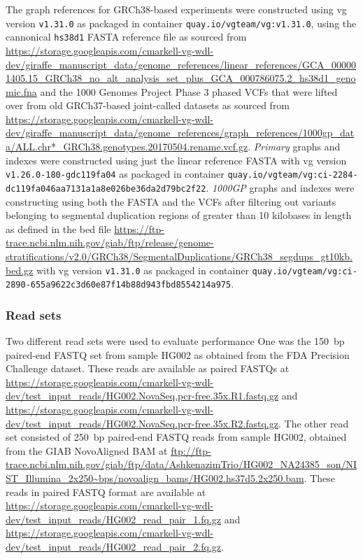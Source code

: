 \documentclass[11pt]{ucscthesis}
\newcommand{\vocab}[1]{\emph{#1}}
\begin{document}
The graph references for GRCh38-based experiments were constructed using vg version \texttt{v1.31.0} as packaged in container \texttt{quay.io/vgteam/vg:v1.31.0}, using the cannonical \texttt{hs38d1} FASTA reference file as sourced from \url{https://storage.googleapis.com/cmarkell-vg-wdl-dev/giraffe_manuscript_data/genome_references/linear_references/GCA_000001405.15_GRCh38_no_alt_analysis_set_plus_GCA_000786075.2_hs38d1_genomic.fna} and the 1000 Genomes Project Phase 3 phased VCFs that were lifted over from old GRCh37-based joint-called datasets as sourced from \url{https://storage.googleapis.com/cmarkell-vg-wdl-dev/giraffe_manuscript_data/genome_references/graph_references/1000gp_data/ALL.chr*_GRCh38.genotypes.20170504.rename.vcf.gz}.
\vocab{Primary} graphs and indexes were constructed using just the linear reference FASTA with vg version \texttt{v1.26.0-180-gdc119fa04} as packaged in container \texttt{quay.io/vgteam/vg:ci-2284-dc119fa046aa7131a1a8e026be36da2d79bc2f22}.
\vocab{1000GP} graphs and indexes were constructing using both the FASTA and the VCFs after filtering out variants belonging to segmental duplication regions of greater than 10 kilobases in length as defined in the bed file \url{https://ftp-trace.ncbi.nlm.nih.gov/giab/ftp/release/genome-stratifications/v2.0/GRCh38/SegmentalDuplications/GRCh38_segdups_gt10kb.bed.gz} with vg version \texttt{v1.31.0} as packaged in container \texttt{quay.io/vgteam/vg:ci-2890-655a9622c3d60e87f14b88d943fbd8554214a975}.


\subsubsection{Read sets}
Two different read sets were used to evaluate performance
One was the 150~bp paired-end FASTQ set from sample HG002 as obtained from the FDA Precision Challenge dataset.
These reads are available as paired FASTQs at \url{https://storage.googleapis.com/cmarkell-vg-wdl-dev/test_input_reads/HG002.NovaSeq.pcr-free.35x.R1.fastq.gz} and \url{https://storage.googleapis.com/cmarkell-vg-wdl-dev/test_input_reads/HG002.NovaSeq.pcr-free.35x.R2.fastq.gz}.
The other read set consisted of 250~bp paired-end FASTQ reads from sample HG002, obtained from the GIAB NovoAligned BAM at \url{ftp://ftp-trace.ncbi.nlm.nih.gov/giab/ftp/data/AshkenazimTrio/HG002_NA24385_son/NIST_Illumina_2x250~bps/novoalign_bams/HG002.hs37d5.2x250.bam}.
These reads in paired FASTQ format are available at \url{https://storage.googleapis.com/cmarkell-vg-wdl-dev/test_input_reads/HG002_read_pair_1.fq.gz} and \url{https://storage.googleapis.com/cmarkell-vg-wdl-dev/test_input_reads/HG002_read_pair_2.fq.gz}.
\end{document}
